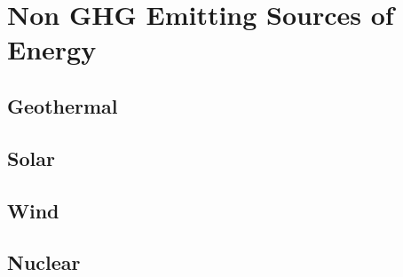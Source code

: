 \chapter{Non GHG Emitting Sources of Energy}\label{ch:non_GHG}

\section{Geothermal}

\section{Solar}

\section{Wind}

\section{Nuclear}


